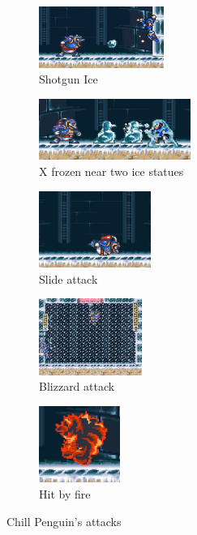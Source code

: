 \begin{figure}[htp]
	\centering
	\begin{subfigure}{0.4\textwidth}
		\centering
		\includegraphics[height=2cm]{figures/X1/Chill_penguin/Chill_shot.jpg}
		\caption{Shotgun Ice}
	\end{subfigure}
	\begin{subfigure}{0.42\textwidth}
		\centering
		\includegraphics[height=2cm]{figures/X1/Chill_penguin/Chill_frozen.jpg}
		\caption{X frozen near two ice statues}
	\end{subfigure}
	\begin{subfigure}{0.32\textwidth}
		\centering
		\includegraphics[height=2.5cm]{figures/X1/Chill_penguin/Chill_slide.jpg}
		\caption{Slide attack}
	\end{subfigure}
	\begin{subfigure}{0.3\textwidth}
		\centering
		\includegraphics[height=2.5cm]{figures/X1/Chill_penguin/Chill_blizzard.jpg}
		\caption{Blizzard attack}
	\end{subfigure}
	\begin{subfigure}{0.22\textwidth}
		\centering
		\includegraphics[height=2.5cm]{figures/X1/Chill_penguin/Chill_burn.jpg}
		\caption{Hit by fire}
	\end{subfigure}
	\caption{Chill Penguin's attacks}
\end{figure}

